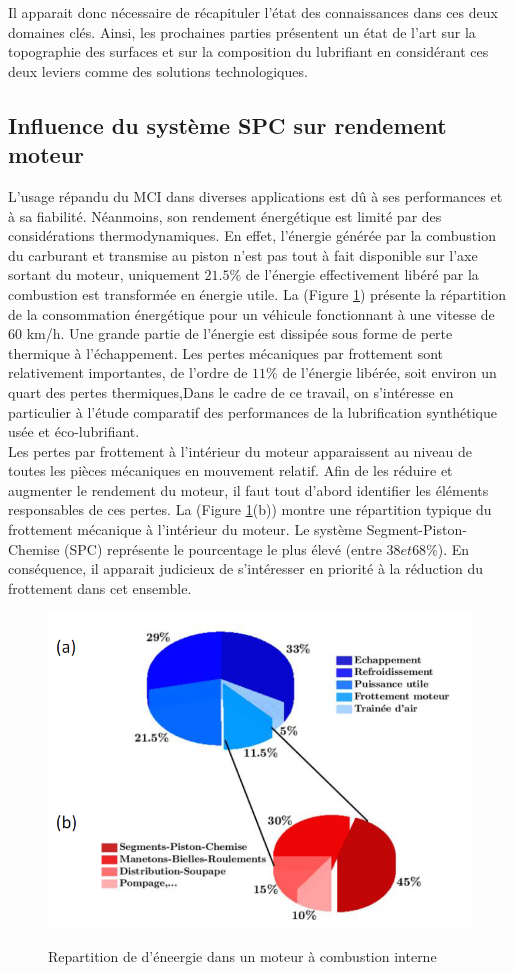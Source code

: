 Il apparait donc nécessaire de récapituler l'état des connaissances dans ces deux domaines clés. Ainsi, les prochaines parties présentent un état de l'art sur la topographie des surfaces et sur la composition du lubrifiant en considérant ces deux leviers comme des solutions technologiques.\\

\subsection{Influence du système SPC sur rendement moteur}
L'usage répandu du MCI dans diverses applications est dû à ses performances et à sa fiabilité. Néanmoins, son rendement énergétique est limité par des considérations thermodynamiques.\cite{kennet} En effet, l'énergie générée par la combustion du carburant et transmise au piston n’est pas tout à fait disponible sur l’axe sortant du moteur, uniquement $21.5\%$ de l'énergie effectivement libéré par la combustion est transformée en énergie utile\cite{kennet}. La (Figure \ref{fig:perte-de-lenergie-fourni})  présente la répartition de la consommation énergétique pour un véhicule fonctionnant à une vitesse de 60 km/h. Une grande partie de l'énergie est dissipée sous forme de perte thermique à l'échappement. Les pertes mécaniques par frottement sont relativement importantes, de l'ordre de $11\%$ de l'énergie libérée, soit environ un quart des pertes thermiques\cite{kennet},Dans le cadre de ce travail, on s'intéresse en particulier à l'étude comparatif des performances de la lubrification synthétique usée et éco-lubrifiant.\\

Les pertes par frottement à l'intérieur du moteur apparaissent au niveau de toutes les pièces mécaniques en mouvement relatif. Afin de les réduire et augmenter le rendement du moteur, il faut tout d'abord identifier les éléments responsables de ces pertes. La (Figure \ref{fig:perte-de-lenergie-fourni}(b)) montre une répartition typique du frottement mécanique à l'intérieur du moteur. Le système Segment-Piston-Chemise (SPC) représente le pourcentage le plus élevé (entre $38 et 68\%$).\cite{kennet} En conséquence, il apparait judicieux de s'intéresser en priorité à la réduction du frottement dans cet ensemble.\\
\begin{figure}[h]
	\centering
	\includegraphics[width=0.5\linewidth]{"Img/perte de l'energie fourni"}
	\caption[Repartition de d'éneergie]{Repartition de d'éneergie dans un moteur à combustion interne}
	\label{fig:perte-de-lenergie-fourni} \cite{Amal}
\end{figure}


